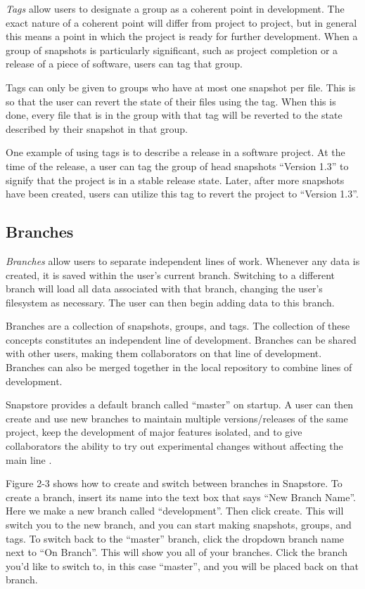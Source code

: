 \textit{Tags} allow users to designate a group as a coherent point in development. The exact nature of a coherent point will differ from project to project, but in general this means a point in which the project is ready for further development. When a group of snapshots is particularly significant, such as project completion or a release of a piece of software, users can tag that group.

Tags can only be given to groups who have at most one snapshot per file. This is so that the user can revert the state of their files using the tag. When this is done, every file that is in the group with that tag will be reverted to the state described by their snapshot in that group.

One example of using tags is to describe a release in a software project. At the time of the release, a user can tag the group of head snapshots ``Version 1.3'' to signify that the project is in a stable release state. Later, after more snapshots have been created, users can utilize this tag to revert the project to ``Version 1.3''.

\subsection{Branches}

\textit{Branches} allow users to separate independent lines of work. Whenever any data is created, it is saved within the user's current branch. Switching to a different branch will load all data associated with that branch, changing the user's filesystem as necessary. The user can then begin adding data to this branch.

Branches are a collection of snapshots, groups, and tags. The collection of these concepts constitutes an independent line of development. Branches can be shared with other users, making them collaborators on that line of development. Branches can also be merged together in the local repository to combine lines of development.

Snapstore provides a default branch called ``master'' on startup. A user can then create and use new branches to maintain multiple versions/releases of the same project, keep the development of major features isolated, and to give collaborators the ability to try out experimental changes without affecting the main line \cite{RossoJackson}.

Figure 2-3 shows how to create and switch between branches in Snapstore. To create a branch, insert its name into the text box that says ``New Branch Name''. Here we make a new branch called ``development''. Then click create. This will switch you to the new branch, and you can start making snapshots, groups, and tags. To switch back to the ``master'' branch, click the dropdown branch name next to ``On Branch''. This will show you all of your branches. Click the branch you'd like to switch to, in this case ``master'', and you will be placed back on that branch.

